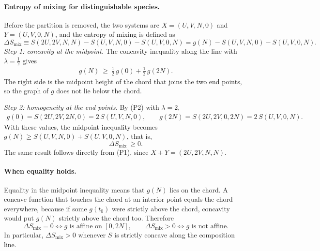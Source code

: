 \paragraph{Entropy of mixing for distinguishable species.}
Before the partition is removed, the two systems are $X=(U,V,N,0)$ and
$Y=(U,V,0,N)$, and the entropy of mixing is defined as
\begin{equation}
    \boxed{\Delta S_{\mathrm{mix}}\equiv S(2U,2V,N,N)-S(U,V,N,0)-S(U,V,0,N)
    =g(N)-S(U,V,N,0)-S(U,V,0,N).}
\end{equation}
\emph{Step 1: concavity at the midpoint.} The concavity inequality along the
line with $\lambda=\tfrac12$ gives
\begin{align*}
    g(N)\ \ge\ \tfrac12\,g(0)+\tfrac12\,g(2N).
\end{align*}
The right side is the midpoint height of the chord that joins the two end
points, so the graph of $g$ does not lie below the chord.

\emph{Step 2: homogeneity at the end points.} By (P2) with $\lambda=2$,
\begin{align*}
    g(0)=S(2U,2V,2N,0)=2\,S(U,V,N,0),\qquad
    g(2N)=S(2U,2V,0,2N)=2\,S(U,V,0,N).
\end{align*}
With these values, the midpoint inequality becomes
$g(N)\ge S(U,V,N,0)+S(U,V,0,N)$, that is,
\begin{equation}
    \boxed{\Delta S_{\mathrm{mix}}\ \ge 0.}
\end{equation}
The same result follows directly from (P1), since $X+Y=(2U,2V,N,N)$.

\paragraph{When equality holds.}
Equality in the midpoint inequality means that $g(N)$ lies on the chord. A
concave function that touches the chord at an interior point equals the
chord everywhere, because if some $g(t_0)$ were strictly above the chord,
concavity would put $g(N)$ strictly above the chord too. Therefore
\begin{equation}
    \boxed{\Delta S_{\mathrm{mix}}=0
    \iff g \text{ is affine on } [0,2N],
    \qquad
    \Delta S_{\mathrm{mix}}>0
    \iff g \text{ is not affine.}}
\end{equation}
In particular, $\Delta S_{\mathrm{mix}}>0$ whenever $S$ is strictly concave
along the composition line.

